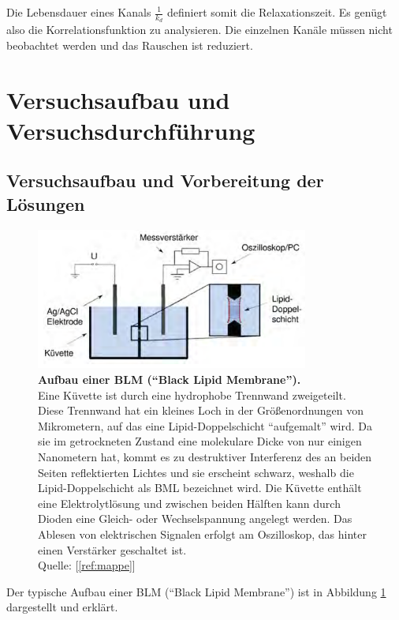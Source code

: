 \documentclass[a4paper,ngerman]{scrartcl}
\begin{document}
Die Lebensdauer eines Kanals $\frac{1}{k_d}$ definiert somit die Relaxationszeit.  Es genügt also die Korrelationsfunktion zu analysieren. Die einzelnen Kanäle müssen nicht beobachtet werden und das Rauschen ist reduziert.



\clearpage
\section{Versuchsaufbau und Versuchsdurchführung}



\subsection{Versuchsaufbau und Vorbereitung der Lösungen}
\label{sec:bilayer-vorbereitung}

\begin{figure}[tb!]
  \centering
  \includegraphics[width=0.8\textwidth]{abbildungen/blmaufbau.png}
  \caption{\textbf{Aufbau einer BLM ("`Black Lipid Membrane"').} \\Eine Küvette ist durch eine hydrophobe Trennwand zweigeteilt. Diese Trennwand hat ein kleines Loch in der Größenordnungen von Mikrometern, auf das eine Lipid-Doppelschicht "`aufgemalt"' wird. Da sie im getrockneten Zustand eine molekulare Dicke von nur einigen Nanometern hat, kommt es zu destruktiver Interferenz des an beiden Seiten reflektierten Lichtes und sie erscheint schwarz, weshalb die Lipid-Doppelschicht als BML bezeichnet wird. Die Küvette enthält eine Elektrolytlösung und zwischen beiden Hälften kann durch Dioden eine Gleich- oder Wechselspannung angelegt werden. Das Ablesen von elektrischen Signalen erfolgt am Oszilloskop, das hinter einen Verstärker geschaltet ist.\\Quelle: [\ref{ref:mappe}]}
  \label{fig:blmaufbau}
\end{figure}

Der typische Aufbau einer BLM ("`Black Lipid Membrane"') ist in Abbildung \ref{fig:blmaufbau} dargestellt und erklärt. \\
\end{document}
